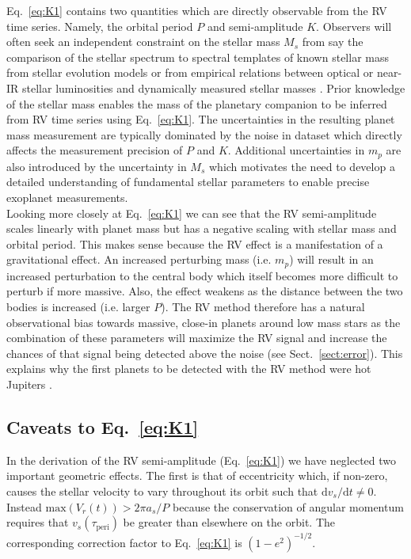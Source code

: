 Eq.~\ref{eq:K1} contains two quantities which are directly observable from the RV time series.
Namely, the orbital period $P$ and semi-amplitude $K$. Observers will often seek an independent
constraint on the stellar mass $M_s$ from say the comparison of the stellar spectrum to
spectral templates of known stellar mass from stellar evolution models
\citep[e.g.][]{muirhead12} or from
empirical relations between optical or near-IR stellar luminosities and dynamically
measured stellar masses \citep[e.g.][]{benedict16,mann19}. Prior knowledge of the
stellar mass enables the mass of the planetary companion to be inferred from RV time series
using Eq.~\ref{eq:K1}.
The uncertainties in the resulting planet mass 
measurement are typically dominated by the noise in dataset which directly affects the
measurement precision of $P$ and $K$. Additional uncertainties in $m_p$ are also introduced by
the uncertainty in $M_s$ which motivates the need to develop a detailed understanding of
fundamental stellar parameters to enable precise exoplanet measurements. \\

Looking more closely at Eq.~\ref{eq:K1} we can see that the RV semi-amplitude scales 
linearly with planet mass but has a negative scaling with stellar mass and orbital 
period. This makes sense because the RV effect is a manifestation of a gravitational effect.
An increased perturbing mass (i.e. $m_p$) will result in an increased perturbation to the 
central body which itself becomes more difficult to perturb if more massive. Also, the 
effect weakens as the distance between the two bodies is increased (i.e. larger $P$). The 
RV method therefore has a natural observational bias towards massive, 
close-in planets around low mass stars as the combination of these parameters will maximize the
RV signal and increase the chances of that signal being detected above the noise (see
Sect.~\ref{sect:error}). This explains why the first planets to be detected with the
RV method were hot Jupiters \citep[e.g.][]{mayor95}.

\subsection{Caveats to Eq.~\ref{eq:K1}}
In the derivation of the RV semi-amplitude (Eq.~\ref{eq:K1}) we have neglected two 
important geometric effects. The first is that of eccentricity which, if non-zero, 
causes the stellar velocity to vary throughout its orbit such that
$\text{d}v_s/\text{d}t \ne 0$. Instead $\mathrm{max}(V_r(t)) > 2\pi a_s/P$ 
because the conservation of angular momentum requires that $v_s(\tau_{\text{peri}})$ 
be greater than elsewhere on the orbit. The corresponding correction 
factor to Eq.~\ref{eq:K1} is $(1-e^2)^{-1/2}$. \\

